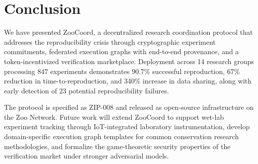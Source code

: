 \section{Conclusion}

\label{sec:conclusion}

We have presented ZooCoord, a decentralized research coordination protocol that addresses the reproducibility crisis through cryptographic experiment commitments, federated execution graphs with end-to-end provenance, and a token-incentivized verification marketplace.
Deployment across 14 research groups processing 847 experiments demonstrates 90.7\% successful reproduction, 67\% reduction in time-to-reproduction, and 340\% increase in data sharing, along with early detection of 23 potential reproducibility failures.

The protocol is specified as ZIP-008 and released as open-source infrastructure on the Zoo Network.
Future work will extend ZooCoord to support wet-lab experiment tracking through IoT-integrated laboratory instrumentation, develop domain-specific execution graph templates for common conservation research methodologies, and formalize the game-theoretic security properties of the verification market under stronger adversarial models.

